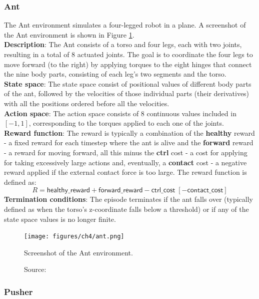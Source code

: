 \subsubsection{Ant}

The Ant environment \cite{antfarama} simulates a four-legged robot
in a plane. A screenshot of the Ant environment
is shown in Figure \ref{fig:ant}.\\
\textbf{Description}: The Ant consists of a torso and four legs, each with
two joints, resulting in a total of $8$ actuated joints.
The goal is to coordinate the four legs to move forward (to the right)
by applying torques to the eight hinges that connect the nine body parts,
consisting of each leg's two segments and the torso.\\
\textbf{State space}: The state space consist of positional values
of different body parts of the ant, followed by the velocities
of those individual parts (their derivatives)
with all the positions ordered before all the velocities.\\
\textbf{Action space}: The action space consists of $8$ continuous values
included in $[-1, 1]$,
corresponding to the torques applied to each one of the joints.\\
\textbf{Reward function}: The reward is typically a combination
of the \textbf{healthy} reward - a fixed reward for each timestep where
the ant is alive and the \textbf{forward} reward - a reward for moving
forward, all this minus the \textbf{ctrl} cost - a cost for applying
for taking excessively large actions and, eventually, a \textbf{contact}
cost - a negative reward applied if the external contact force is too large.
The reward function is defined as:
\begin{equation}
    R = \textsf{healthy\_reward} + \textsf{forward\_reward} - \textsf{ctrl\_cost} \;[- \textsf{contact\_cost}]
\end{equation}
\textbf{Termination conditions}: The episode terminates
if the ant falls over
(typically defined as when the torso's z-coordinate falls below a threshold)
or if any of the state space values is no longer finite.

\begin{figure}[h]
    \centering
    \texttt{[image: figures/ch4/ant.png]}
    \caption{Screenshot of the Ant environment.}
    \vspace{-10px}
    \caption*{\scriptsize{Source: \cite{antpic}}}
    \label{fig:ant}
\end{figure}

\subsubsection{Pusher}

